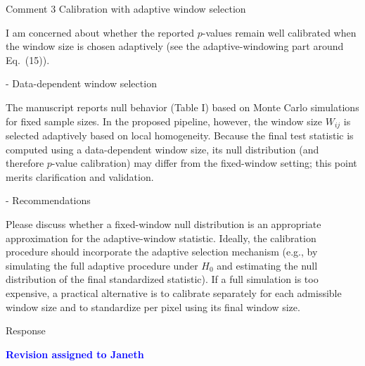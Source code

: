 \documentclass[11pt]{report}
\newcommand{\assigned}[1]{\textcolor{blue}{\textbf{#1}}}
\begin{document}
\begin{reviewbox}{Comment 3}
Calibration with adaptive window selection

I am concerned about whether the reported $p$-values remain well calibrated when the window size is chosen adaptively (see the adaptive-windowing part around Eq.~(15)).

- Data-dependent window selection

The manuscript reports null behavior (Table I) based on Monte Carlo simulations for fixed sample sizes. In the proposed pipeline, however, the window size $W_{ij}$ is selected adaptively based on local homogeneity. Because the final test statistic is computed using a data-dependent window size, its null distribution (and therefore $p$-value calibration) may differ from the fixed-window setting; this point merits clarification and validation.

- Recommendations

Please discuss whether a fixed-window null distribution is an appropriate approximation for the adaptive-window statistic. Ideally, the calibration procedure should incorporate the adaptive selection mechanism (e.g., by simulating the full adaptive procedure under $H_0$ and estimating the null distribution of the final standardized statistic). If a full simulation is too expensive, a practical alternative is to calibrate separately for each admissible window size and to standardize per pixel using its final window size.
\end{reviewbox}

\begin{responsebox}{Response}

\assigned{Revision assigned to Janeth}

\end{responsebox}
\end{document}
